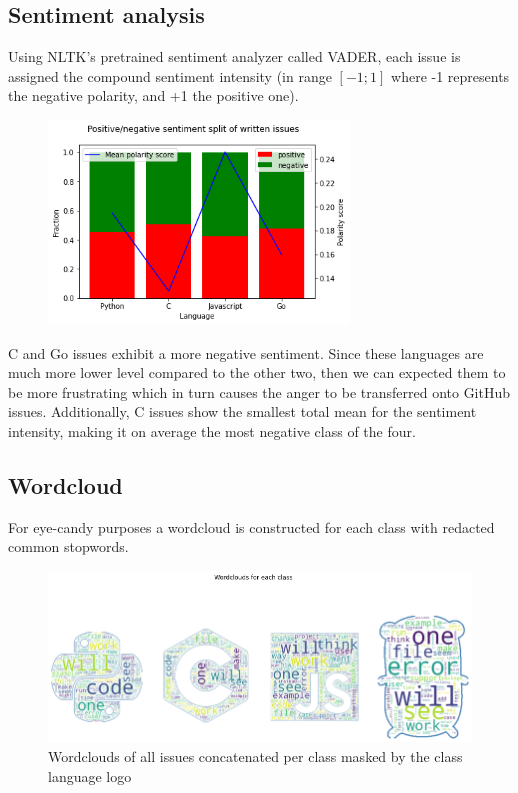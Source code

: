\documentclass[]{article}
\begin{document}
\subsection{Sentiment analysis}

Using NLTK's pretrained sentiment analyzer called VADER, each issue is assigned the compound sentiment intensity (in range $[-1; 1]$ where -1 represents the negative polarity, and +1 the positive one).

\begin{figure}[H]
    \centering
    \includegraphics[width=8cm]{sentiment.png}
\end{figure}

C and Go issues exhibit a more negative sentiment. Since these languages are much more lower level compared to the other two, then we can expected them to be more frustrating which in turn causes the anger to be transferred onto GitHub issues. Additionally, C issues show the smallest total mean for the sentiment intensity, making it on average the most negative class of the four.

\subsection{Wordcloud}

For eye-candy purposes a wordcloud is constructed for each class with redacted common stopwords.

\begin{figure}[H]
    \centering
    \includegraphics[width=\textwidth]{wordcloud.png}
    \caption{Wordclouds of all issues concatenated per class masked by the class language logo}
\end{figure}
\end{document}
